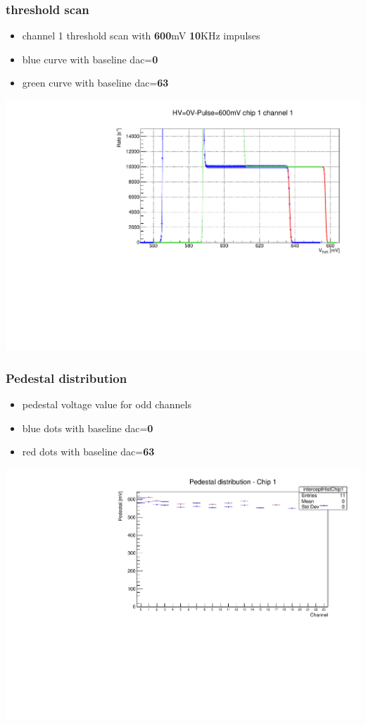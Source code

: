 \documentclass[aspectratio=169]{beamer}
\begin{document}
	\begin{frame}
	\frametitle{threshold scan}
		\begin{itemize}
			\item channel 1 threshold scan with \textbf{600}mV \textbf{10}KHz impulses
			\item {\color{blue}blue} curve with baseline dac=\textbf{0}
			\item {\color{green}green} curve with baseline dac=\textbf{63}  
		\end{itemize}	
		\begin{center}
			\includegraphics[width=0.65 \textwidth]{IMG/ThScan_ch0.pdf}
		\end{center}
		
	\end{frame}

	\begin{frame}
	\frametitle{Pedestal distribution}
	\begin{itemize}
		\item pedestal voltage value for odd channels
		\item {\color{blue}blue} dots with baseline dac=\textbf{0}
		\item {\color{red}red} dots with baseline dac=\textbf{63}
	\end{itemize}
	\begin{center}
		\includegraphics[width=0.65 \textwidth]{IMG/TB1-DAC0-DAC63.pdf}
	\end{center}
	
	\end{frame}
\end{document}
